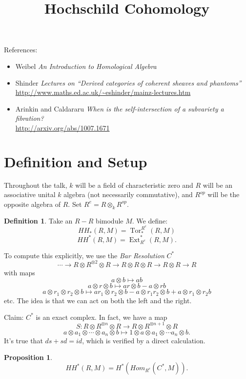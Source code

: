 \documentclass[12pt]{amsart}
\title{Hochschild Cohomology}
\newtheorem{prop}[equation]{Proposition}
\theoremstyle{definition}
\newtheorem{defn}[equation]{Definition}
\newcommand{\Ext}{\operatorname{Ext}} %
\newcommand{\Tor}{\operatorname{Tor}}
\renewcommand{\to}{\longrightarrow}
\begin{document}
\maketitle

References: 
\begin{itemize}
\item Weibel \emph{An Introduction to Homological Algebra}
\item Shinder \emph{Lectures on ``Derived categories of coherent sheaves and phantoms''} \\ \url{http://www.maths.ed.ac.uk/~eshinder/mainz-lectures.htm}
\item Arinkin and Caldararu \emph{When is the self-intersection of a subvariety a fibration?} \\ \url{http://arxiv.org/abs/1007.1671}
\end{itemize}
\section{Definition and Setup}
Throughout the talk, $k$ will be a field of characteristic zero and $R$ will be an associative unital $k$ algebra (not necessarily commutative), and $R^{op}$ will be the opposite algebra of $R$.   Set $R^e = R\otimes_k R^{op}$.

\begin{defn}
Take an $R-R$ bimodule $M$.  We define:
$$HH_*(R,M) = \Tor_*^{R^e} (R,M)$$
$$HH^*(R,M) = \Ext^*_{R^e} (R,M).$$
\end{defn}
\noindent To compute this explicitly, we use the \emph{Bar Resolution} $C^*$
$$\cdots \to R\otimes R^{\otimes 2} \otimes R\to R\otimes R\otimes R \to R\otimes R \to R$$
with maps 
$$a\otimes b \mapsto ab$$
$$a\otimes r\otimes b \mapsto ar\otimes b - a\otimes rb$$
$$a\otimes r_1\otimes r_2 \otimes b \mapsto ar_1\otimes r_2\otimes b - a\otimes r_1r_2\otimes b + a\otimes r_1\otimes r_2b$$ etc. 
The idea is that we can act on both the left and the right. 

Claim: $C^*$ is an exact complex.  In fact, we have a map 
$$S: R\otimes R^{\otimes n} \otimes R \to R\otimes R^{\otimes n + 1} \otimes R$$
$$a\otimes a_1\otimes\cdots \otimes a_n \otimes b \mapsto 1\otimes a \otimes a_1\otimes \cdots a_n \otimes b.$$
It's true that $ds + sd = id$, which is verified by a direct calculation.

\begin{prop}
$$HH^* (R,M) = H^*(Hom_{R^e}(C^*,M)).$$
\end{prop}
\end{document}
